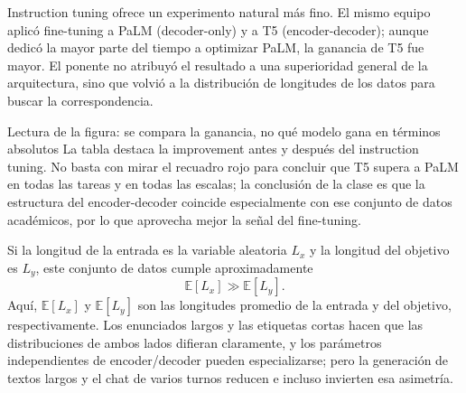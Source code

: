 Instruction tuning ofrece un experimento natural más fino. El mismo equipo aplicó fine-tuning a PaLM (decoder-only) y a T5 (encoder-decoder); aunque dedicó la mayor parte del tiempo a optimizar PaLM, la ganancia de T5 fue mayor. El ponente no atribuyó el resultado a una superioridad general de la arquitectura, sino que volvió a la distribución de longitudes de los datos para buscar la correspondencia.



\begin{knowledgebox}{Lectura de la figura: se compara la ganancia, no qué modelo gana en términos absolutos}
La tabla destaca la improvement antes y después del instruction tuning. No basta con mirar el recuadro rojo para concluir que T5 supera a PaLM en todas las tareas y en todas las escalas; la conclusión de la clase es que la estructura del encoder-decoder coincide especialmente con ese conjunto de datos académicos, por lo que aprovecha mejor la señal del fine-tuning.
\end{knowledgebox}


Si la longitud de la entrada es la variable aleatoria $L_x$ y la longitud del objetivo es $L_y$, este conjunto de datos cumple aproximadamente
\[
\mathbb{E}[L_x]\gg \mathbb{E}[L_y].
\]
Aquí, $\mathbb{E}[L_x]$ y $\mathbb{E}[L_y]$ son las longitudes promedio de la entrada y del objetivo, respectivamente. Los enunciados largos y las etiquetas cortas hacen que las distribuciones de ambos lados difieran claramente, y los parámetros independientes de encoder/decoder pueden especializarse; pero la generación de textos largos y el chat de varios turnos reducen e incluso invierten esa asimetría.


